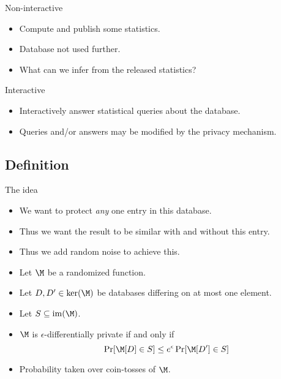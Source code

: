 \begin{frame}
  \begin{block}{Non-interactive}
    \begin{itemize}
      \item Compute and publish some statistics.
      \item Database not used further.
      \item What can we infer from the released statistics?
    \end{itemize}
  \end{block}

  \pause{}

  \begin{block}{Interactive}
    \begin{itemize}
      \item Interactively answer statistical queries about the database.
      \item Queries and/or answers may be modified by the privacy mechanism.
    \end{itemize}
  \end{block}
\end{frame}

\subsection{Definition}

\begin{frame}
  \begin{block}{The idea}
    \begin{itemize}
      \item We want to protect \emph{any} one entry in this database.

        \pause{}

      \item Thus we want the result to be similar with and without this entry.

        \pause{}

      \item Thus we add random noise to achieve this.
    \end{itemize}
  \end{block}
\end{frame}

\begin{frame}
  \begin{definition}
    \begin{itemize}
      \item Let \(\M\) be a randomized function.
      \item Let \(D, D'\in \ker(\M)\) be databases differing on at most one 
        element.
      \item Let \(S\subseteq \im(\M)\).
      \item \(\M\) is \(\epsilon\)-differentially private if and only if
        \[\Pr[\M[D]\in S] \leq e^\epsilon \Pr[\M[D']\in S]\]
      \item \color{red} Probability taken over coin-tosses of \(\M\).
      \end{itemize}
  \end{definition}
\end{frame}

